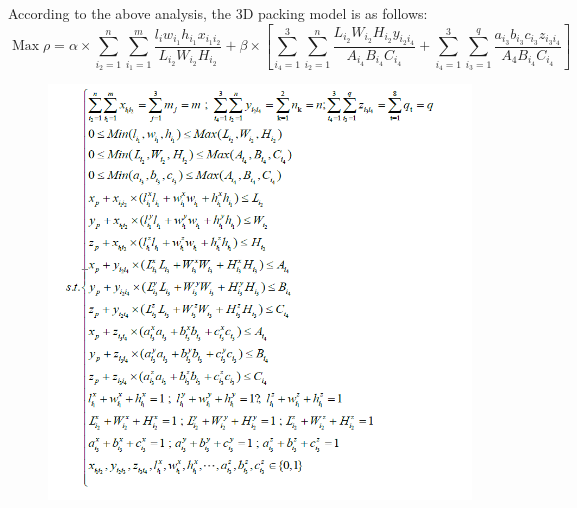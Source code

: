 \documentclass[a4paper,12pt]{article}
\begin{document}
	According to the above analysis, the 3D packing model is as follows:
	\begin{equation*}
	\operatorname{Max} \rho=\alpha \times \sum_{i_{2}=1}^{n} \sum_{i_{1}=1}^{m} \frac{l_{i} w_{i_{1}} h_{i_{1}} x_{i_{1} i_{2}}}{L_{i_{2}} W_{i_{2}} H_{i_{2}}}+\beta \times\left[\sum_{i_{4}=1}^{3} \sum_{i_{2}=1}^{n} \frac{L_{i_{2}} W_{i_{2}} H_{i_{2}} y_{i_{2} i_{4}}}{A_{i_{4}} B_{i_{4}} C_{i_{4}}}+\sum_{i_{4}=1}^{3} \sum_{i_{3}=1}^{q} \frac{a_{i_{3}} b_{i_{3}} c_{i_{3}} z_{i_{3} i_{4}}}{A_{4} B_{i_{4}} C_{i_{4}}}\right]	
	\end{equation*}
	\begin{figure}
		\centering
		\includegraphics[width=0.7\linewidth]{2}
		\caption{}
	\end{figure}
\end{document}
